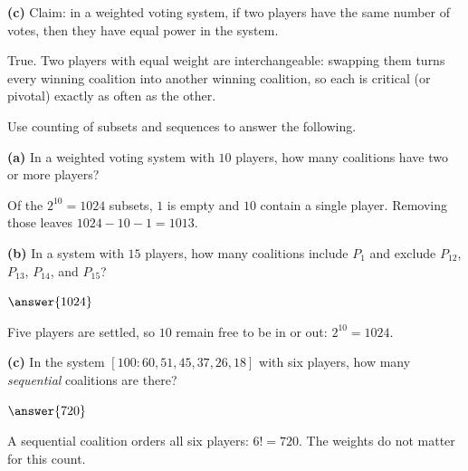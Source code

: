 \documentclass[12pt]{ximera}
\begin{document}
\begin{problem}
\begin{prompt}
\textbf{(c)} Claim: in a weighted voting system, if two players have the same number of
votes, then they have equal power in the system.

\begin{multipleChoice}
\end{multipleChoice}

\begin{feedback}
True. Two players with equal weight are interchangeable: swapping them turns every
winning coalition into another winning coalition, so each is critical (or pivotal)
exactly as often as the other.
\end{feedback}
\end{prompt}
\end{problem}

\begin{problem}
Use counting of subsets and sequences to answer the following.

\begin{prompt}
\textbf{(a)} In a weighted voting system with $10$ players, how many coalitions have two
or more players?

\begin{multipleChoice}
\end{multipleChoice}

\begin{feedback}
Of the $2^{10}=1024$ subsets, $1$ is empty and $10$ contain a single player. Removing
those leaves $1024-10-1=1013$.
\end{feedback}
\end{prompt}

\begin{prompt}
\textbf{(b)} In a system with $15$ players, how many coalitions include $P_1$ and exclude
$P_{12}$, $P_{13}$, $P_{14}$, and $P_{15}$?

$\answer{1024}$

\begin{feedback}
Five players are settled, so $10$ remain free to be in or out: $2^{10}=1024$.
\end{feedback}
\end{prompt}

\begin{prompt}
\textbf{(c)} In the system $[100:60,51,45,37,26,18]$ with six players, how many
\emph{sequential} coalitions are there?

$\answer{720}$

\begin{feedback}
A sequential coalition orders all six players: $6!=720$. The weights do not matter for
this count.
\end{feedback}
\end{prompt}
\end{problem}
\end{document}
